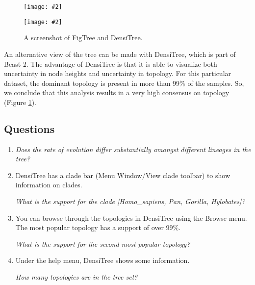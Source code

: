 \documentclass[12pt]{article}
\newcommand{\includeimage}[2][]{%
\texttt{[image: \#2]}
}
\begin{document}
\begin{figure}
\centering	
\includeimage[width=0.9\textwidth]{figures/FigTree}
\includeimage[width=0.9\textwidth]{figures/DensiTree}
\caption{A screenshot of FigTree and DensiTree.}
\label{fig:FigTree}
\end{figure}

An alternative view of the tree can be made with DensiTree, which is part of Beast 2. The advantage
of DensiTree is that it is able to visualize both uncertainty in node heights and uncertainty in topology.
For this particular dataset, the dominant topology is present in more than 99\% of the samples. So, 
we conclude that this analysis results in a very high consensus on topology (Figure \ref{fig:FigTree}).



\newpage
\subsection*{Questions}

\begin{enumerate}
\item \textit{Does the rate of evolution differ substantially amongst different lineages in the tree?}


\item DensiTree has a clade bar (Menu Window/View clade toolbar) to show information on clades.

\textit{What is the support for the clade [Homo\_sapiens, Pan, Gorilla, Hylobates]?}


\item You can browse through the topologies in DensiTree using the Browse menu.
The most popular topology has a support of over 99\%.

\textit{What is the support for the second most popular topology?}


\item Under the help menu, DensiTree shows some information.

\textit{How many topologies are in the tree set?}


\end{enumerate}
\end{document}
